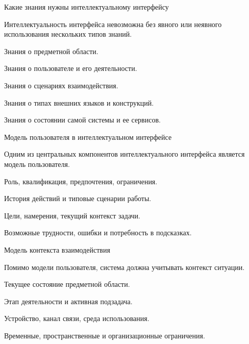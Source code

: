 \begin{frame}{Какие знания нужны интеллектуальному интерфейсу}
	\topline
	\justifying

	Интеллектуальность интерфейса невозможна без явного или неявного использования нескольких типов знаний.
	
	\begin{textitemize}
		\item Знания о предметной области.
		\item Знания о пользователе и его деятельности.
		\item Знания о сценариях взаимодействия.
		\item Знания о типах внешних языков и конструкций.
		\item Знания о состоянии самой системы и ее сервисов.
	\end{textitemize}
\end{frame}

\begin{frame}{Модель пользователя в интеллектуальном интерфейсе}
	\topline
	\justifying

	Одним из центральных компонентов интеллектуального интерфейса является модель пользователя.
	
	\begin{textitemize}
		\item Роль, квалификация, предпочтения, ограничения.
		\item История действий и типовые сценарии работы.
		\item Цели, намерения, текущий контекст задачи.
		\item Возможные трудности, ошибки и потребность в подсказках.
	\end{textitemize}
\end{frame}

\begin{frame}{Модель контекста взаимодействия}
	\topline
	\justifying

	Помимо модели пользователя, система должна учитывать контекст ситуации.
	
	\begin{textitemize}
		\item Текущее состояние предметной области.
		\item Этап деятельности и активная подзадача.
		\item Устройство, канал связи, среда использования.
		\item Временные, пространственные и организационные ограничения.
	\end{textitemize}
\end{frame}

